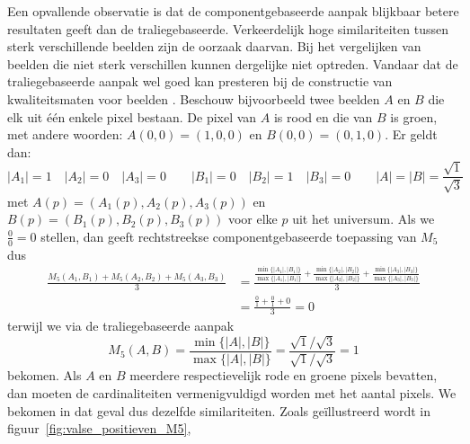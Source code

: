 Een opvallende observatie is dat de componentgebaseerde aanpak blijkbaar betere resultaten 
geeft dan de traliegebaseerde. Verkeerdelijk hoge similariteiten tussen sterk verschillende 
beelden zijn de oorzaak daarvan. Bij het vergelijken
van beelden die niet sterk verschillen kunnen dergelijke  niet optreden.
Vandaar dat de traliegebaseerde aanpak wel goed kan presteren bij de constructie van
kwaliteitsmaten voor beelden \cite{debaets:similariteitsmaten_voor_kleurbeelden}.
Beschouw bijvoorbeeld twee beelden $A$ en $B$ die elk uit \'e\'en enkele pixel bestaan. De pixel 
van $A$ is rood en die van $B$ is groen, met andere woorden: $A(0,0)=(1,0,0)$ en 
$B(0,0)=(0,1,0)$. Er geldt dan: 
\begin{displaymath}
|A_1|=1 \quad |A_2|=0 \quad |A_3|=0 \qquad |B_1|=0 \quad |B_2|=1 \quad |B_3|=0 \qquad |A|=|B|=\frac{\sqrt{1}}{\sqrt{3}}
\end{displaymath}
met $A(p)=(A_1(p),A_2(p),A_3(p))$ en $B(p)=(B_1(p),B_2(p),B_3(p))$ voor elke $p$ uit het universum. Als we
$\frac{0}{0} = 0$ stellen, dan geeft rechtstreekse componentgebaseerde toepassing van 
$M_5$ dus
\begin{align*}
\displaystyle\frac{M_5(A_1,B_1)+M_5(A_2,B_2)+M_5(A_3,B_3)}{3} 
&= \displaystyle\frac{\frac{\min\{|A_1|,|B_1|\}}{\max\{|A_1|,|B_1|\}}+\frac{\min\{|A_2|,|B_2|\}}{\max\{|A_2|,|B_2|\}}+\frac{\min\{|A_3|,|B_3|\}}{\max\{|A_3|,|B_3|\}}}{3} \\
&= \displaystyle\frac{\frac{0}{1}+\frac{0}{1}+0}{3} = 0
\end{align*}
terwijl we via de traliegebaseerde aanpak
\begin{displaymath}
M_5(A,B) = \frac{\min\{|A|,|B|\}}{\max\{|A|,|B|\}} = \frac{\scriptstyle \sqrt{1} / \sqrt{3}}{\scriptstyle \sqrt{1} / \sqrt{3}} = 1
\end{displaymath}
bekomen. Als $A$ en $B$ meerdere respectievelijk rode en groene pixels bevatten, dan moeten de cardinaliteiten
vermenigvuldigd worden met het aantal pixels. We bekomen in dat geval dus dezelfde similariteiten. Zoals
ge\"illustreerd wordt in figuur~\ref{fig:valse_positieven_M5}, 
